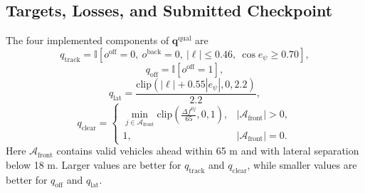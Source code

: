 \documentclass[journal]{IEEEtran}
\begin{document}
\subsection{Targets, Losses, and Submitted Checkpoint}
\label{supp:training_objective}

The four implemented components of $\mathbf q^{\mathrm{qual}}$ are
\begin{equation}
q_{\mathrm{track}}
=
\mathbb{I}
[
o^{\mathrm{off}}=0,\ 
o^{\mathrm{back}}=0,\ 
|\ell|\le0.46,\ 
\cos e_\psi\ge0.70
],
\end{equation}
\begin{equation}
q_{\mathrm{off}}
=
\mathbb{I}[o^{\mathrm{off}}=1],
\end{equation}
\begin{equation}
q_{\mathrm{lat}}
=
\frac{
\mathrm{clip}(|\ell|+0.55|e_\psi|,0,2.2)
}{2.2},
\end{equation}
\begin{equation}
q_{\mathrm{clear}}
=
\begin{cases}
\displaystyle
\min_{j\in\mathcal{A}_{\mathrm{front}}}
\mathrm{clip}
\left(
\frac{\Delta f^{0j}}{65},0,1
\right),
& |\mathcal{A}_{\mathrm{front}}|>0,\\[2mm]
1,
& |\mathcal{A}_{\mathrm{front}}|=0.
\end{cases}
\end{equation}
Here $\mathcal{A}_{\mathrm{front}}$ contains valid vehicles ahead within
65 m and with lateral separation below 18 m. Larger values are better
for $q_{\mathrm{track}}$ and $q_{\mathrm{clear}}$, while smaller values
are better for $q_{\mathrm{off}}$ and $q_{\mathrm{lat}}$.
\end{document}
